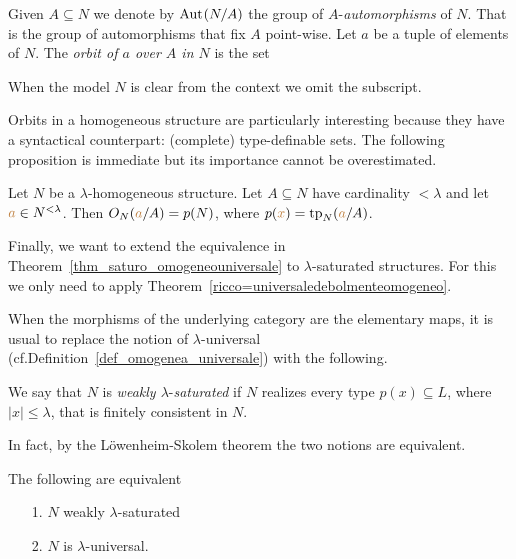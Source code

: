 Given $A\subseteq N$ we denote by \emph{${\rm Aut\kern.15ex}(N/A)$\/} the group of \emph{$A\mbox{-}$automorphisms\/} of $N$. That is the group of automorphisms that fix $A$ point-wise.
Let $a$ be a tuple of elements of $N$. The \emph{orbit of $a$ over $A$ in $N$} is the set


When the model $N$ is clear from the context we omit the subscript.

Orbits in a homogeneous structure are particularly interesting because they have a syntactical counterpart: (complete) type-definable sets.
The following proposition is immediate but its importance cannot be overestimated.

\begin{proposition}\label{omogeneitaorbitetipi}
Let $N$ be a $\lambda\mbox{-}$homogeneous structure. Let $A\subseteq N$ have cardinality $<\lambda$ and let ${\color{brown} a}\in N^{<\lambda}$. Then $O_N({\color{brown} a}/A)=p(N)$, where $p({\color{brown} x})={\rm tp}_N({\color{brown} a}/A)$.
\end{proposition}


Finally, we want to extend the equivalence in Theorem~\ref{thm_saturo_omogeneouniversale} to $\lambda\mbox{-}$saturated structures. For this we only need to apply Theorem~\ref{ricco=universaledebolmenteomogeneo}. 

When the morphisms of the underlying category are the elementary maps, it is usual to replace the notion of $\lambda\mbox{-}$universal (cf.\@ Definition~\ref{def_omogenea_universale}) with the following.

\begin{definition}\label{def_w_saturation}
  We say that $N$ is \emph{weakly $\lambda\mbox{-}$saturated\/} if $N$ realizes every type $p(x)\subseteq L$, where $|x|\le\lambda$, that is finitely consistent in $N$.
\end{definition}

In fact, by the L\"owenheim-Skolem theorem the two notions are equivalent.

\begin{proposition}\label{prop_w_saturation}
The following are equivalent
\begin{itemize}
\item[1.] $N$ weakly $\lambda\mbox{-}$saturated
\item[2.] $N$ is $\lambda$-universal.
\end{itemize}
\end{proposition}


